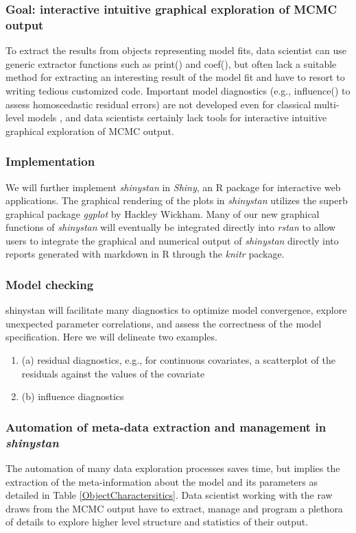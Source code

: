 \documentclass[11pt,notitlepage]{article}
\begin{document}
\subsubsection*{Goal: interactive intuitive graphical exploration of MCMC output} 
To extract the results from objects representing model fits, data scientist can 
use generic extractor functions such as print() and coef(), but often lack a suitable 
method for extracting an interesting result of the model fit and have to resort to 
writing tedious customized code. Important model diagnostics 
(e.g., influence() to assess  homoscedastic residual errors) are not 
developed even for classical multi-level models \cite{Galecki2013linear}, 
and data scientists certainly lack tools for interactive intuitive graphical 
exploration of MCMC output.

\subsubsection*{Implementation}
We will further implement \textit{shinystan}
in \textit{Shiny}, an R package for interactive 
web applications. The graphical rendering of the plots in \textit{shinystan} 
utilizes the superb graphical package \textit{ggplot} by Hackley Wickham. 
Many of our new graphical functions of \textit{shinystan} will eventually be 
integrated directly into \textit{rstan} to allow users to integrate the graphical 
and numerical output of \textit{shinystan} directly into reports generated with 
markdown in R through the \textit{knitr} package.

\subsubsection*{Model checking}
shinystan will facilitate many diagnostics to optimize model convergence, explore unexpected parameter 
correlations, and assess the correctness of the model specification. Here we will delineate two examples.
\begin{enumerate}
\item (a) residual diagnostics, e.g., for continuous covariates, a scatterplot of the residuals against the values of the covariate
 
\item (b) influence diagnostics
\end{enumerate}

\subsubsection*{Automation of meta-data extraction and management in \textit{shinystan}}
The automation of many data exploration processes saves time, but implies the extraction of the meta-information about the model and 
its parameters as detailed in Table \ref{ObjectCharactersitics}. Data scientist working with the raw draws from the MCMC output 
have to extract, manage and program a plethora of details to explore higher level structure and statistics of their output. 
\end{document}
